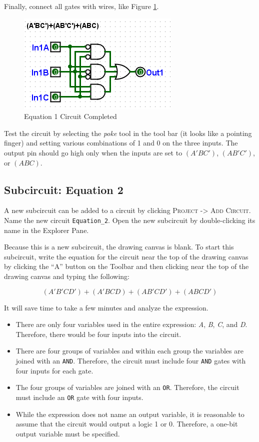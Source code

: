 Finally, connect all gates with wires, like Figure \ref{fig:02-04}. 

\begin{figure}[H]
	\centering
	\includegraphics[width=\maxwidth{.95\linewidth}]{gfx/02-04}
	\caption{Equation 1 Circuit Completed}
	\label{fig:02-04}
\end{figure}

Test the circuit by selecting the \textit{poke} tool in the tool bar (it looks like a pointing finger) and setting various combinations of 1 and 0 on the three inputs. The output pin should go high only when the inputs are set to $ (A'BC') $, $ (AB'C') $, or $ (ABC) $.

\subsection{Subcircuit: Equation 2}

A new subcircuit can be added to a circuit by clicking \textsc{Project -> Add Circuit}. Name the new circuit \lstinline[columns=fixed]|Equation_2|. Open the new subcircuit by double-clicking its name in the Explorer Pane. 

Because this is a new subcircuit, the drawing canvas is blank. To start this subcircuit, write the equation for the circuit near the top of the drawing canvas by clicking the ``A'' button on the Toolbar and then clicking near the top of the drawing canvas and typing the following:

\[ (A'B'CD')+(A'BCD)+(AB'CD')+(ABCD') \]

It will save time to take a few minutes and analyze the expression. 

\begin{itemize}
	\item There are only four variables used in the entire expression: \textit{A}, \textit{B}, \textit{C}, and \textit{D}. Therefore, there would be four inputs into the circuit.
	\item There are four groups of variables and within each group the variables are joined with an \texttt{AND}. Therefore, the circuit must include four \texttt{AND} gates with four inputs for each gate.
	\item The four groups of variables are joined with an \texttt{OR}. Therefore, the circuit must include an \texttt{OR} gate with four inputs.
	\item While the expression does not name an output variable, it is reasonable to assume that the circuit would output a logic 1 or 0. Therefore, a one-bit output variable must be specified.
\end{itemize}

